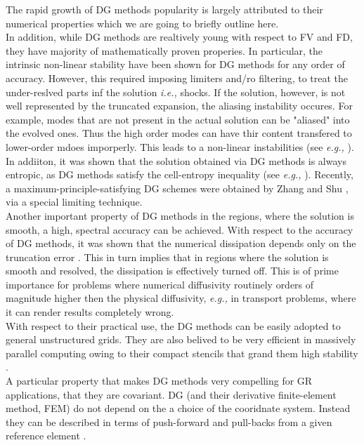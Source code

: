 \documentclass[11pt,a4paper,headinclude=true,DIV=14,BCOR=8mm,chapterprefix,listof=totoc,twoside,openright,abstracton]{scrbook}
\begin{document}
The rapid growth of DG methods popularity is largely attributed to their numerical properties which we are going to briefly outline here. \\

In addition, while DG methods are realtively young with respect to FV and FD, they have majority of mathematically proven properies. In particular, the intrinsic non-linear stability have been shown for DG methods for any order of accuracy. However, this required imposing limiters and/ro filtering, to treat the under-reslved parts inf the solution \textit{i.e.,} shocks. If the solution, however, is not well represented by the truncated expansion, the aliasing instability occures. For example, modes that are not present in the actual solution can be "aliased" into the evolved ones. Thus the high order modes can have thir content transfered to lower-order mdoes imporperly. This leads to a non-linear instabilities (see \textit{e.g.,} \cite{Boyd:2001}). In addiiton, it was shown that the solution obtained via DG methods is always entropic, as DG methods satisfy the cell-entropy inequality (see \textit{e.g.,} \cite{Cockburn:2003}). Recently, a maximum-principle-satisfying DG schemes were obtained by Zhang and Shu \cite{Zhang:2011}, via a special limiting technique. \\

Another important property of DG methods in the regions, where the solution is smooth, a high, spectral accuracy can be achieved. With respect to the accuracy of DG methods, it was shown that the numerical dissipation depends only on the truncation error \cite{Cockburn:2003}. This in turn implies that in regions where the solution is smooth and resolved, the dissipation is effectively turned off. This is of prime importance for problems where numerical diffusivity routinely orders of magnitude higher then the physical diffusivity, \textit{e.g.,} in transport problems, where it can render results completely wrong. \\

With respect to their practical use, the DG methods can be easily adopted to general unstructured grids. They are also belived to be very efficient in massively parallel computing owing to their compact stencils that grand them high stability \cite{Biswas:1994}. \\

A particular property that makes DG methods very compelling for GR applications, that they are covariant. DG (and their derivative finite-element method, FEM) do not depend on the a choice of the cooridnate system. Instead they can be described in terms of push-forward and pull-backs from a given reference element \cite{Meier:1999}. \\
\end{document}
